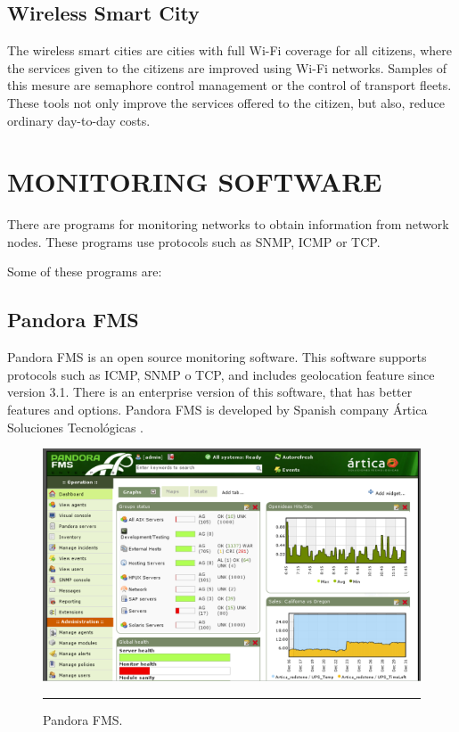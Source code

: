 \documentclass[12pt, a4paper,twoside]{tesi_upf}
\begin{document}
\subsection{Wireless Smart City}
The wireless smart cities are cities with full Wi-Fi coverage for all citizens, where the services given to the citizens are improved using Wi-Fi networks. Samples of this mesure are semaphore control management or the control of transport fleets. These tools not only improve the services offered to the citizen, but also, reduce ordinary day-to-day costs.

\section{MONITORING SOFTWARE}

There are programs for monitoring networks to obtain information from network nodes. These programs use protocols such as SNMP, ICMP or TCP. 

Some of these programs are:
\subsection{Pandora FMS}
Pandora FMS is an open source monitoring software. This software supports protocols such as ICMP, SNMP o TCP, and includes geolocation feature since version 3.1. There is an enterprise version of this software, that has better features and options. Pandora FMS is developed by Spanish company Ártica Soluciones Tecnológicas \cite{pandorafms}.

        \begin{figure}[H]
          \centering
              \includegraphics[scale=0.9]{./figures/PandoraFMS.png}
              \rule{32em}{0.5pt}
          \caption[Pandora FMS]{Pandora FMS.}
          \label{fig:Pandora}
        \end{figure}
\end{document}
